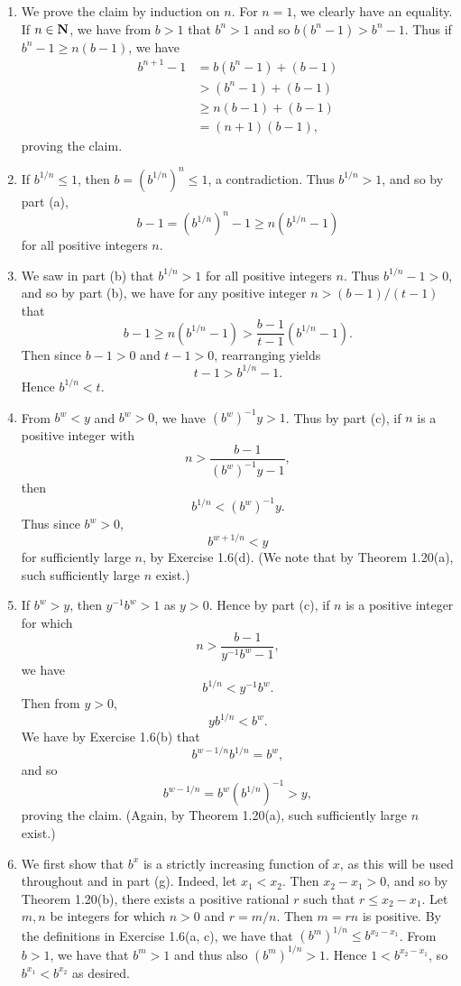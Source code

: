 \begin{ex}
\begin{enumerate}
\item We prove the claim by induction on $n$. For $n = 1$, we clearly have an equality. If $n \in \mathbf{N}$, we have from $b > 1$ that $b^n > 1$ and so $b(b^n-1) > b^n-1$. Thus if $b^n-1 \geq n(b-1)$, we have
\begin{align*}
b^{n+1} - 1 & = b(b^n - 1) + (b-1)\\
& > (b^n-1) + (b-1)\\
& \geq n(b-1) + (b-1)\\
& = (n+1)(b-1),
\end{align*}
proving the claim.

\item If $b^{1/n} \leq 1$, then $b = (b^{1/n})^n \leq 1$, a contradiction. Thus $b^{1/n} > 1$, and so by part (a), \[b - 1 = (b^{1/n})^n - 1 \geq n(b^{1/n} - 1)\] for all positive integers $n$.

\item We saw in part (b) that $b^{1/n} > 1$ for all positive integers $n$. Thus $b^{1/n} - 1 > 0$, and so by part (b), we have for any positive integer $n > (b-1)/(t-1)$ that \[b - 1\geq n(b^{1/n} - 1) > \frac{b-1}{t-1}(b^{1/n} - 1).\] Then since $b -1 > 0$ and $t - 1 > 0$, rearranging yields \[t - 1 > b^{1/n} - 1.\] Hence $b^{1/n} < t$.

\item From $b^w < y$ and $b^w > 0$, we have $(b^w)^{-1}y > 1$. Thus by part (c), if $n$ is a positive integer with \[n > \frac{b - 1}{(b^w)^{-1}y - 1},\] then \[b^{1/n} < (b^w)^{-1}y.\] Thus since $b^w > 0$, \[b^{w + 1/n} < y\] for sufficiently large $n$, by Exercise 1.6(d). (We note that by Theorem 1.20(a), such sufficiently large $n$ exist.)

\item If $b^w > y$, then $y^{-1}b^w > 1$ as $y > 0$. Hence by part (c), if $n$ is a positive integer for which \[n > \frac{b - 1}{y^{-1}b^w - 1},\] we have \[b^{1/n} < y^{-1}b^w.\] Then from $y > 0$, \[yb^{1/n} < b^w.\] We have by Exercise 1.6(b) that \[b^{w - 1/n}b^{1/n} = b^w,\] and so \[b^{w - 1/n} = b^w(b^{1/n})^{-1} > y,\] proving the claim. (Again, by Theorem 1.20(a), such sufficiently large $n$ exist.)

\item We first show that $b^x$ is a strictly increasing function of $x$, as this will be used throughout and in part (g). Indeed, let $x_1 < x_2$. Then $x_2 - x_1 > 0$, and so by Theorem 1.20(b), there exists a positive rational $r$ such that $r \leq x_2 - x_1$. Let $m, n$ be integers for which $n > 0$ and $r = m/n$. Then $m = rn$ is positive. By the definitions in Exercise 1.6(a, c), we have that $(b^m)^{1/n} \leq b^{x_2-x_1}$. From $b > 1$, we have that $b^m > 1$ and thus also $(b^m)^{1/n} > 1$. Hence $1 < b^{x_2-x_1}$, so $b^{x_1} < b^{x_2}$ as desired.


\end{enumerate}
\end{ex}

